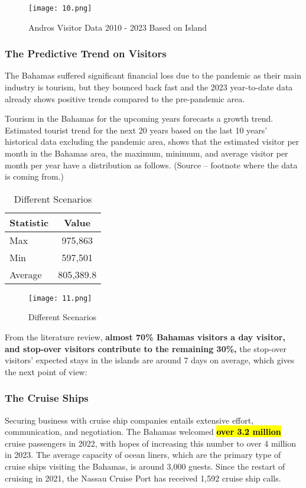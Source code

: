\documentclass{article}
\begin{document}
\begin{figure}[H]
\centering
\texttt{[image: 10.png]}
\caption{Andros Visitor Data 2010 - 2023 Based on Island}
\label{fig:unique_label_10}
\end{figure}




\subsubsection{The Predictive Trend on Visitors}  

The Bahamas suffered significant financial loss due to the pandemic as their main industry is tourism, but they bounced back fast and the 2023 year-to-date data already shows positive trends compared to the pre-pandemic area.\par
Tourism in the Bahamas for the upcoming years forecasts a growth trend. Estimated tourist trend for the next 20 years based on the last 10 years’ historical data excluding the pandemic area, shows that the estimated visitor per month in the Bahamas area, the maximum, minimum, and average visitor per month per year have a distribution as follows. (Source – footnote where the data is coming from.) \par

\begin{table}[h]
\centering
\begin{tabular}{lc}
\toprule
Statistic & Value \\
\midrule
Max & 975,863 \\
Min & 597,501 \\
Average & 805,389.8 \\
\bottomrule
\end{tabular}
\caption{Different Scenarios}
\label{tab:statistics}
\end{table}

\begin{figure}[H]
\centering
\texttt{[image: 11.png]}
\caption{Different Scenarios }
\label{fig:unique_label_11}
\end{figure}

From the literature review, \textbf{almost 70\% Bahamas visitors a day visitor, and stop-over visitors contribute to the remaining 30\%,} the stop-over visitors’ expected stays in the islands are around 7 days on average, which gives the next point of view: 

\subsubsection{The Cruise Ships} 
Securing business with cruise ship companies entails extensive effort, communication, and negotiation. The Bahamas welcomed \hl{\textbf{over 3.2 million}} cruise passengers in 2022, with hopes of increasing this number to over 4 million in 2023. The average capacity of ocean liners, which are the primary type of cruise ships visiting the Bahamas, is around 3,000 guests. Since the restart of cruising in 2021, the Nassau Cruise Port has received 1,592 cruise ship calls.\par
\end{document}
